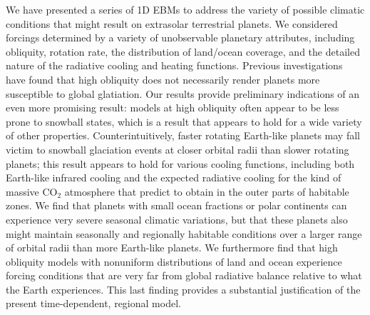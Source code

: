 We have presented a series of 1D EBMs to address the variety of
possible climatic conditions that might result on extrasolar
terrestrial planets.  We considered forcings determined by a variety
of unobservable planetary attributes, including obliquity, rotation
rate, the distribution of land/ocean coverage, and the detailed nature
of the radiative cooling and heating functions.  Previous
investigations have found that high obliquity does not necessarily
render planets more susceptible to global glatiation.  Our results
provide preliminary indications of an even more promising result:
models at high obliquity often appear to be less prone to snowball
states, which is a result that appears to hold for a wide variety of
other properties.  Counterintuitively, faster rotating Earth-like
planets may fall victim to snowball glaciation events at closer
orbital radii than slower rotating planets; this result appears to
hold for various cooling functions, including both Earth-like infrared
cooling and the expected radiative cooling for the kind of massive
CO$_2$ atmosphere that \citet{kasting_et_al1993} predict to obtain in
the outer parts of habitable zones.  We find that planets with small
ocean fractions or polar continents can experience very severe
seasonal climatic variations, but that these planets also might
maintain seasonally and regionally habitable conditions over a larger
range of orbital radii than more Earth-like planets.  We furthermore
find that high obliquity models with nonuniform distributions of land
and ocean experience forcing conditions that are very far from global
radiative balance relative to what the Earth experiences.  This last
finding provides a substantial justification of the present
time-dependent, regional model.


